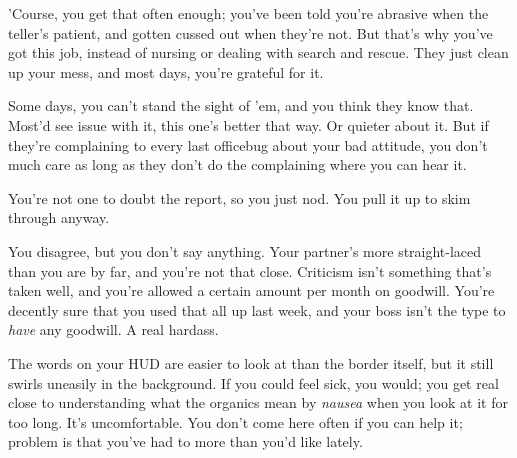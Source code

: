'Course, you get that often enough; you've been told you're abrasive when the teller's patient, and gotten cussed out when they're not. But that's why you've got this job, instead of nursing or dealing with search and rescue. They just clean up your mess, and most days, you're grateful for it.

Some days, you can't stand the sight of 'em, and you think they know that. Most'd see issue with it, this one's better that way. Or quieter about it. But if they're complaining to every last officebug about your bad attitude, you don't much care as long as they don't do the complaining where you can hear it. 


You're not one to doubt the report, so you just nod. You pull it up to skim through anyway. 


You disagree, but you don't say anything. Your partner's more straight-laced than you are by far, and you're not that close. Criticism isn't something that's taken well, and you're allowed a certain amount per month on goodwill. You're decently sure that you used that all up last week, and your boss isn't the type to \emph{have} any goodwill. A real hardass.

The words on your HUD are easier to look at than the border itself, but it still swirls uneasily in the background. If you could feel sick, you would; you get real close to understanding what the organics mean by \emph{nausea} when you look at it for too long. It's uncomfortable. You don't come here often if you can help it; problem is that you've had to more than you'd like lately.

